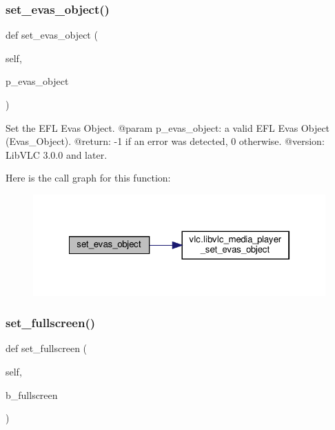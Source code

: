\subsubsection{\texorpdfstring{set\+\_\+evas\+\_\+object()}{set\_evas\_object()}}
{\footnotesize\ttfamily def set\+\_\+evas\+\_\+object (\begin{DoxyParamCaption}\item[{}]{self,  }\item[{}]{p\+\_\+evas\+\_\+object }\end{DoxyParamCaption})}

\begin{DoxyVerb}Set the EFL Evas Object.
@param p_evas_object: a valid EFL Evas Object (Evas_Object).
@return: -1 if an error was detected, 0 otherwise.
@version: LibVLC 3.0.0 and later.
\end{DoxyVerb}
 Here is the call graph for this function\+:
\nopagebreak
\begin{figure}[H]
\begin{center}
\leavevmode
\includegraphics[width=322pt]{classvlc_1_1_media_player_ad03f3853ac2685e1a62ca0f98121a1df_cgraph}
\end{center}
\end{figure}
\mbox{\label{classvlc_1_1_media_player_ae0b0d98dfef2ddc6a696b9f04725dade}} 
\subsubsection{\texorpdfstring{set\+\_\+fullscreen()}{set\_fullscreen()}}
{\footnotesize\ttfamily def set\+\_\+fullscreen (\begin{DoxyParamCaption}\item[{}]{self,  }\item[{}]{b\+\_\+fullscreen }\end{DoxyParamCaption})}


